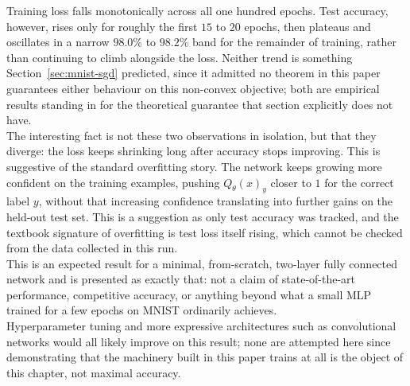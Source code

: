 	Training loss falls monotonically across all one hundred epochs. Test accuracy, however, rises only for roughly the first $15$ to $20$ epochs, then plateaus and oscillates in a narrow $98.0\%$ to $98.2\%$ band for the remainder of training, rather than continuing to climb alongside the loss. Neither trend is something Section~\ref{sec:mnist-sgd} predicted, since it admitted no theorem in this paper guarantees either behaviour on this non-convex objective; both are empirical results standing in for the theoretical guarantee that section explicitly does not have. \\
	
	The interesting fact is not these two observations in isolation, but that they diverge: the loss keeps shrinking long after accuracy stops improving. This is suggestive of the standard overfitting story. The network keeps growing more confident on the training examples, pushing $Q_\theta(x)_y$ closer to $1$ for the correct label $y$, without that increasing confidence translating into further gains on the held-out test set. This is a suggestion as only test accuracy was tracked, and the textbook signature of overfitting is test loss itself rising, which cannot be checked from the data collected in this run. \\
	
	This is an expected result for a minimal, from-scratch, two-layer fully connected network and is presented as exactly that: not a claim of state-of-the-art performance, competitive accuracy, or anything beyond what a small MLP trained for a few epochs on MNIST ordinarily achieves. \\
	
	Hyperparameter tuning and more expressive architectures such as convolutional networks would all likely improve on this result; none are attempted here since demonstrating that the machinery built in this paper trains at all is the object of this chapter, not maximal accuracy.